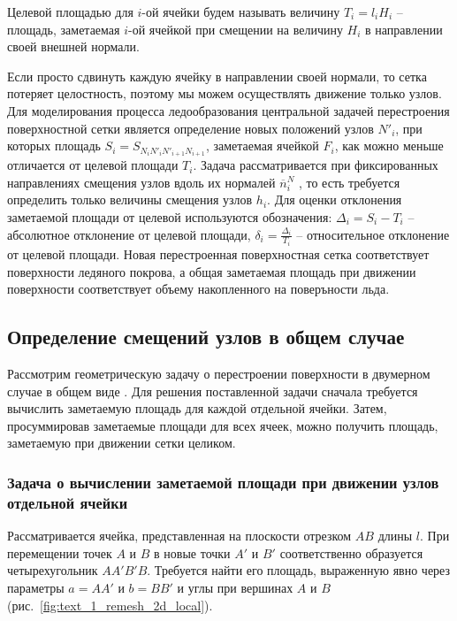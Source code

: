 \begin{definition}
Целевой площадью для $i$-ой ячейки будем называть величину $T_i = l_i H_i$ -- площадь, заметаемая $i$-ой ячейкой при смещении на величину $H_i$ в направлении своей внешней нормали.
\end{definition}

Если просто сдвинуть каждую ячейку в направлении своей нормали, то сетка потеряет целостность, поэтому мы можем осуществлять движение только узлов.
Для моделирования процесса ледообразования центральной задачей перестроения поверхностной сетки является определение новых положений узлов $N'_i$, при которых площадь $S_i = S_{N_iN'_iN'_{i+1}N_{i+1}}$, заметаемая ячейкой $F_i$, как можно меньше отличается от целевой площади $T_i$.
Задача рассматривается при фиксированных направлениях смещения узлов вдоль их нормалей $\overline{n}_i^N$ \cite{Fortin2004Remesh2d}, то есть требуется определить только величины смещения узлов $h_i$.
Для оценки отклонения заметаемой площади от целевой используются обозначения: $\Delta_i = S_i - T_i$ -- абсолютное отклонение от целевой площади, $\delta_i = \frac{\Delta_i}{T_i}$ -- относительное отклонение от целевой площади.
Новая перестроенная поверхностная сетка соответствует поверхности ледяного покрова, а общая заметаемая площадь при движении поверхности соответствует объему накопленного на поверъности льда.


\subsection{Определение смещений узлов в общем случае}

Рассмотрим геометрическую задачу о перестроении поверхности в двумерном случае в общем виде \cite{Rybakov2019Geo2D}.
Для решения поставленной задачи сначала требуется вычислить заметаемую площадь для каждой отдельной ячейки.
Затем, просуммировав заметаемые площади для всех ячеек, можно получить площадь, заметаемую при движении сетки целиком.

\subsubsection{Задача о вычислении заметаемой площади при движении узлов отдельной ячейки}

Рассматривается ячейка, представленная на плоскости отрезком $AB$ длины $l$.
При перемещении точек $A$ и $B$ в новые точки $A'$ и $B'$ соответственно образуется четырехугольник $AA'B'B$.
Требуется найти его площадь, выраженную явно через параметры $a = AA'$ и $b = BB'$ и углы при вершинах $A$ и $B$ (рис.~\ref{fig:text_1_remesh_2d_local}).

